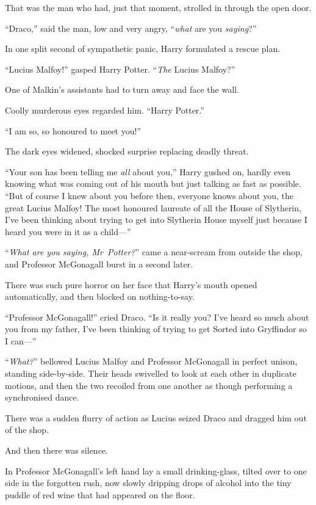 That was the man who had, just that moment, strolled in through the open door.

“Draco,” said the man, low and very angry, “\emph{what} are you \emph{saying}?”

In one split second of sympathetic panic, Harry formulated a rescue plan.

“Lucius Malfoy!” gasped Harry Potter. “\emph{The} Lucius Malfoy?”

One of Malkin’s assistants had to turn away and face the wall.

Coolly murderous eyes regarded him.
“Harry Potter.”

“I am so, so honoured to meet you!”

The dark eyes widened, shocked surprise replacing deadly threat.

“Your son has been telling me \emph{all} about you,” Harry gushed on, hardly even knowing what was coming out of his mouth but just talking as fast as possible.
“But of course I knew about you before then, everyone knows about you, the great Lucius Malfoy! The most honoured laureate of all the House of Slytherin, I’ve been thinking about trying to get into Slytherin House myself just because I heard you were in it as a child—”

“\emph{What are you saying, Mr~Potter?}” came a near-scream from outside the shop, and Professor McGonagall burst in a second later.

There was such pure horror on her face that Harry’s mouth opened automatically, and then blocked on nothing-to-say.

“Professor McGonagall!” cried Draco.
“Is it really you? I’ve heard so much about you from my father, I’ve been thinking of trying to get Sorted into Gryffindor so I can—”

“\emph{What?}” bellowed Lucius Malfoy and Professor McGonagall in perfect unison, standing side-by-side. Their heads swivelled to look at each other in duplicate motions, and then the two recoiled from one another as though performing a synchronised dance.

There was a sudden flurry of action as Lucius seized Draco and dragged him out of the shop.

And then there was silence.

In Professor McGonagall’s left hand lay a small drinking-glass, tilted over to one side in the forgotten rush, now slowly dripping drops of alcohol into the tiny puddle of red wine that had appeared on the floor.

